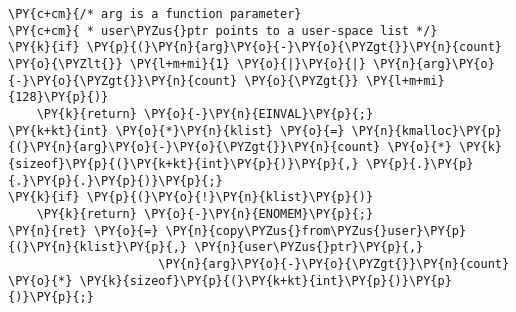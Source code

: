 \begin{Verbatim}[commandchars=\\\{\},codes={\catcode`\$=3\catcode`\^=7\catcode`\_=8}]
\PY{c+cm}{/* arg is a function parameter}
\PY{c+cm}{ * user\PYZus{}ptr points to a user-space list */}
\PY{k}{if} \PY{p}{(}\PY{n}{arg}\PY{o}{-}\PY{o}{\PYZgt{}}\PY{n}{count} \PY{o}{\PYZlt{}} \PY{l+m+mi}{1} \PY{o}{|}\PY{o}{|} \PY{n}{arg}\PY{o}{-}\PY{o}{\PYZgt{}}\PY{n}{count} \PY{o}{\PYZgt{}} \PY{l+m+mi}{128}\PY{p}{)}
    \PY{k}{return} \PY{o}{-}\PY{n}{EINVAL}\PY{p}{;}
\PY{k+kt}{int} \PY{o}{*}\PY{n}{klist} \PY{o}{=} \PY{n}{kmalloc}\PY{p}{(}\PY{n}{arg}\PY{o}{-}\PY{o}{\PYZgt{}}\PY{n}{count} \PY{o}{*} \PY{k}{sizeof}\PY{p}{(}\PY{k+kt}{int}\PY{p}{)}\PY{p}{,} \PY{p}{.}\PY{p}{.}\PY{p}{.}\PY{p}{)}\PY{p}{;}
\PY{k}{if} \PY{p}{(}\PY{o}{!}\PY{n}{klist}\PY{p}{)}
    \PY{k}{return} \PY{o}{-}\PY{n}{ENOMEM}\PY{p}{;}
\PY{n}{ret} \PY{o}{=} \PY{n}{copy\PYZus{}from\PYZus{}user}\PY{p}{(}\PY{n}{klist}\PY{p}{,} \PY{n}{user\PYZus{}ptr}\PY{p}{,}
                     \PY{n}{arg}\PY{o}{-}\PY{o}{\PYZgt{}}\PY{n}{count} \PY{o}{*} \PY{k}{sizeof}\PY{p}{(}\PY{k+kt}{int}\PY{p}{)}\PY{p}{)}\PY{p}{;}
\end{Verbatim}
